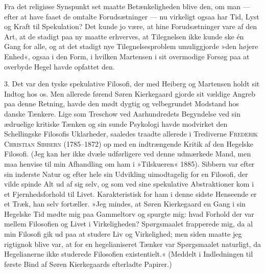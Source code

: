 \documentclass[12pt,a4paper,openany]{book}
\newcommand{\opage}[1]{\marginnote{\footnotesize\textit{[#1]}}}
\begin{document}
Fra det religiøse Synspunkt set maatte Betænkeligheden
blive den, om man --- efter at have faaet de omtalte
Forudsætninger --- nu virkeligt ogsaa har Tid, Lyst
og Kraft til Spekulation? Det kunde jo være, at hine
Forudsætninger vare af den Art, at de stadigt paa ny
maatte erhverves, at Tilegnelsen ikke kunde ske én Gang
\opage{21}for alle, og at det stadigt nye Tilegnelsesproblem umuliggjorde
»den højere Enhed«, ogsaa i den Form, i hvilken
Martensen i sit overmodige Forsøg paa at overbyde Hegel
havde opfattet den.

3. Det var den tyske spekulative Filosofi, der med
Heiberg og Martensen holdt sit Indtog hos os. Men
allerede førend Søren Kierkegaard gjorde sit vældige
Angreb paa denne Retning, havde den mødt dygtig og
velbegrundet Modstand hos danske Tænkere. Lige som
Treschow ved Aarhundredets Begyndelse ved sin ædruelige
kritiske Tænken og sin sunde Psykologi havde modvirket
den Schellingske Filosofis Uklarheder, saaledes
traadte allerede i Trediverne \textsc{Frederik Christian Sibbern}
(1785--1872) op med en indtrængende Kritik af den
Hegelske Filosofi. (Jeg kan her ikke dvæle udførligere
ved denne udmærkede Mand, men maa henvise til min
Afhandling om ham i »Tilskueren« 1885). Sibbern var
efter sin inderste Natur og efter hele sin Udvikling
uimodtagelig for en Filosofi, der vilde spinde Alt ud af
sig selv, og som ved sine spekulative Abstraktioner kom
i et Fjernhedsforhold til Livet. Karakteristisk for ham
i denne sidste Henseende er et Træk, han selv fortæller.
»Jeg mindes, at Søren Kierkegaard en Gang i sin Hegelske
Tid mødte mig paa Gammeltorv og spurgte mig: hvad
Forhold der var mellem Filosofien og Livet i Virkeligheden?
Spørgsmaalet frapperede mig, da al min Filosofi
gik ud paa at studere Liv og Virkelighed; men siden
maatte jeg rigtignok blive var, at for en hegelianiseret
Tænker var Spørgsmaalet naturligt, da Hegelianerne
ikke studerede Filosofien existentielt.« (Meddelt i Indledningen
til første Bind af Søren Kierkegaards efterladte
Papirer.)
\end{document}
